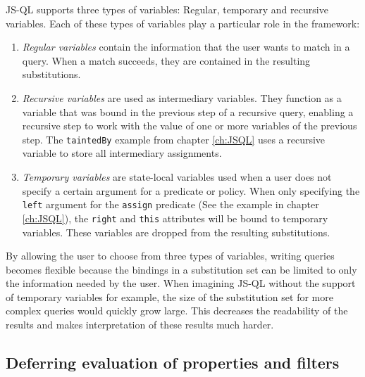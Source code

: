 JS-QL supports three types of variables: Regular, temporary and recursive variables. Each of these types of variables play a particular role in the framework:
\begin{enumerate}
\item \textit{Regular variables} contain the information that the user wants to match in a query. When a match succeeds, they are contained in the resulting substitutions.
\item \textit{Recursive variables} are used as intermediary variables. They function as a variable that was bound in the previous step of a recursive query, enabling a recursive step to work with the value of one or more variables of the previous step. The \texttt{taintedBy} example from chapter \ref{ch:JSQL} uses a recursive variable to store all intermediary assignments.
\item \textit{Temporary variables} are state-local variables used when a user does not specify a certain argument for a predicate or policy. When only specifying the \texttt{left} argument for the \texttt{assign} predicate (See the example in chapter \ref{ch:JSQL}), the \texttt{right} and \texttt{this} attributes will be bound to temporary variables. These variables are dropped from the resulting substitutions.
\end{enumerate}

\noindent By allowing the user to choose from three types of variables, writing queries becomes flexible because the bindings in a substitution set can be limited to only the information needed by the user. When imagining JS-QL without the support of temporary variables for example, the size of the substitution set for more complex queries would quickly grow large. This decreases the readability of the results and makes interpretation of these results much harder.

\subsection*{Deferring evaluation of properties and filters}

